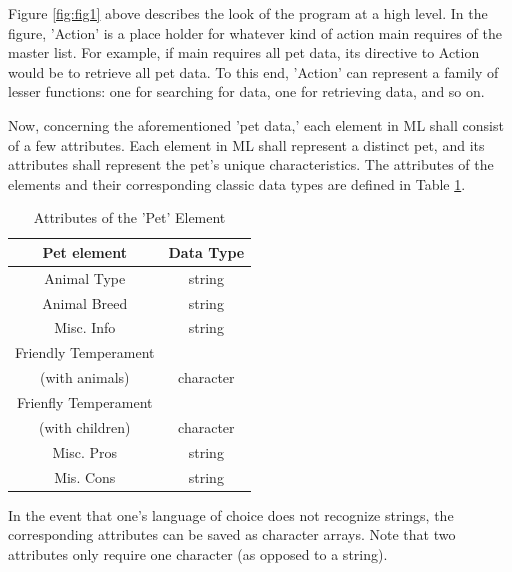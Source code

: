 \documentclass[12]{article}
\begin{document}
	Figure \ref{fig:fig1} above describes the look of the program at a high level. In the figure, 'Action' is a place holder for whatever kind of action main requires of the master list. For example, if main requires all pet data, its directive to Action would be to retrieve all pet data. To this end, 'Action' can represent a family of lesser functions: one for searching for data, one for retrieving data, and so on.
	
	Now, concerning the aforementioned 'pet data,' each element in ML shall consist of a few attributes. Each element in ML shall represent a distinct pet, and its attributes shall represent the pet's unique characteristics. The attributes of the elements and their corresponding classic data types are defined in Table \ref{tab:tab1}.
\begin{table}[h]
	\centering
	\begin{tabular}{c|c}
	\bf{Pet element} & \bf{Data Type}\\ \hline
	Animal Type & string\\ \hline
	Animal Breed & string \\ \hline
	Misc. Info & string \\ \hline
	Friendly Temperament \\ (with animals) & character \\ \hline
	Frienfly Temperament \\ (with children) & character \\ \hline
	Misc. Pros & string \\ \hline
	Mis. Cons & string \\
	\end{tabular}
\caption{Attributes of the 'Pet' Element} \label{tab:tab1}
\end{table}
In the event that one's language of choice does not recognize strings, the corresponding attributes can be saved as character arrays. Note that two attributes only require one character (as opposed to a string).
\end{document}
